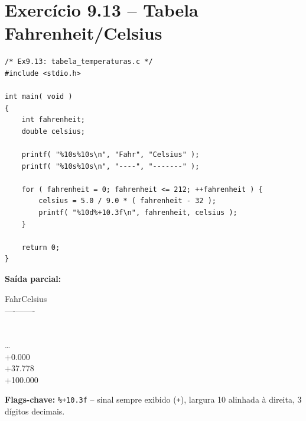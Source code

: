 \documentclass[12pt,a4paper]{article}
\begin{document}
\newpage

\section{Exercício 9.13 -- Tabela Fahrenheit/Celsius}

\begin{respostabox}
\begin{lstlisting}
/* Ex9.13: tabela_temperaturas.c */
#include <stdio.h>

int main( void )
{
    int fahrenheit;
    double celsius;

    printf( "%10s%10s\n", "Fahr", "Celsius" );
    printf( "%10s%10s\n", "----", "-------" );

    for ( fahrenheit = 0; fahrenheit <= 212; ++fahrenheit ) {
        celsius = 5.0 / 9.0 * ( fahrenheit - 32 );
        printf( "%10d%+10.3f\n", fahrenheit, celsius );
    }

    return 0;
}
\end{lstlisting}

\textbf{Saída parcial:}
\begin{saida}
\textvisiblespace\textvisiblespace\textvisiblespace\textvisiblespace\textvisiblespace\textvisiblespace Fahr\textvisiblespace\textvisiblespace\textvisiblespace Celsius\\
\textvisiblespace\textvisiblespace\textvisiblespace\textvisiblespace\textvisiblespace\textvisiblespace ----\textvisiblespace\textvisiblespace\textvisiblespace -------\\
\textvisiblespace\textvisiblespace\textvisiblespace\textvisiblespace\textvisiblespace\textvisiblespace\textvisiblespace\textvisiblespace{}\textvisiblespace{}\\
\textvisiblespace\textvisiblespace\textvisiblespace\textvisiblespace\textvisiblespace\textvisiblespace\textvisiblespace\textvisiblespace{}\textvisiblespace{}\\
\ldots\\
\textvisiblespace\textvisiblespace\textvisiblespace\textvisiblespace\textvisiblespace\textvisiblespace\textvisiblespace{}\textvisiblespace\textvisiblespace\textvisiblespace +0.000\\
\textvisiblespace\textvisiblespace\textvisiblespace\textvisiblespace\textvisiblespace\textvisiblespace{}\textvisiblespace\textvisiblespace +37.778\\
\textvisiblespace\textvisiblespace\textvisiblespace\textvisiblespace\textvisiblespace\textvisiblespace{}\textvisiblespace +100.000
\end{saida}

\textbf{Flags-chave:} \texttt{\%+10.3f} -- sinal sempre exibido (\texttt{+}),
largura 10 alinhada à direita, 3 dígitos decimais.
\end{respostabox}
\end{document}
